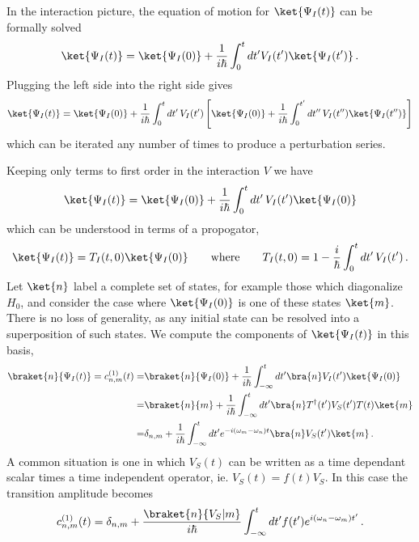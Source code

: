 
In the interaction picture, the equation of motion for $\ket{\Psi_{I}(t)}$ can be formally solved
\begin{equation}
  \ket{\Psi_I(t)}
  = \ket{\Psi_I(0)} + \frac{1}{i \hbar}\int_0^t dt' V_I(t') \ket{\Psi_I(t')}
  \, .
\end{equation}
Plugging the left side into the right side gives
\begin{equation}
  \ket{\Psi_I(t)}
  = \ket{\Psi_I(0)} + \frac{1}{i \hbar} \int_0^t dt' \, V_I(t') \left[ \ket{\Psi_{I}(0)} + \frac{1}{i \hbar} \int_0^{t'}dt'' \, V_I(t'') \ket{\Psi_I(t'')} \right]
\end{equation}
which can be iterated any number of times to produce a perturbation series.

Keeping only terms to first order in the interaction $V$ we have
\begin{equation}
  \ket{\Psi_I(t)} = \ket{\Psi_I(0)} + \frac{1}{i \hbar} \int_0^t dt' \, V_I(t') \ket{\Psi_I(0)}
\end{equation}
which can be understood in terms of a propogator,
\begin{equation}
  \ket{\Psi_I(t)} = T_I(t,0) \ket{\Psi_I(0)}
  \qquad \text{where} \qquad
  T_I(t,0) = 1 - \frac{i}{\hbar} \int_0^t dt' \, V_I(t')
  \, .
\end{equation}
Let $\ket{n}$ label a complete set of states, for example those which diagonalize $H_0$, and consider the case where $\ket{\Psi_I(0)}$ is one of these states $\ket{m}$.
There is no loss of generality, as any initial state can be resolved into a superposition of such states.
We compute the components of $\ket{\Psi_I(t)}$ in this basis,
\begin{align}
  \braket{n}{\Psi_I(t)} = c^{(1)}_{n,m}(t)
  =& \braket{n}{\Psi_I(0)} + \frac{1}{i\hbar} \int_{-\infty}^t dt' \bra{n} V_I(t') \ket{\Psi_I(0)} \nonumber \\
  =& \braket{n}{m} + \frac{1}{i \hbar}\int_{-\infty}^t dt' \bra{n}T^{\dagger}(t')V_S(t')T(t)\ket{m} \nonumber \\
  =& \delta_{n,m} + \frac{1}{i \hbar}\int_{-\infty}^t dt' e^{-i (\omega_m-\omega_n) t} \bra{n}V_S(t')\ket{m}
  \, .
\end{align}
A common situation is one in which $V_S(t)$ can be written as a time dependant scalar times a time independent operator, ie. $V_S(t) = f(t)V_S$. In this case the transition amplitude becomes
\begin{equation}
  c^{(1)}_{n,m}(t) =
    \delta_{n,m} + \frac{\braket{n}{V_S|m}}{i \hbar}\int_{-\infty}^t dt' f(t') e^{i(\omega_n - \omega_m)t'}
  \, .
\end{equation}
